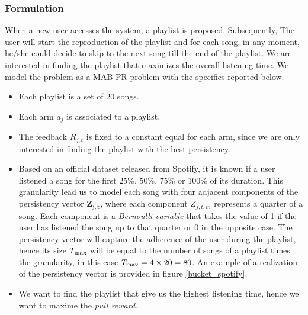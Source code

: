 \subsubsection*{Formulation}
When a new user accesses the system, a playlist is proposed. Subsequently, The user will start the reproduction of the playlist and for each song, in any moment, he/she could decide to skip to the next song till the end of the playlist. We are interested in finding the playlist that maximizes the overall listening time. We model the problem as a MAB-PR problem with the specifics reported below.
\begin{itemize}
	\item Each playlist is a set of 20 songs.
	\item Each arm $a_j$ is associated to a playlist.
	\item The feedback $R_{j,t}$ is fixed to a constant equal for each arm, since we are only interested in finding the playlist with the best persistency.
	\item Based on an official dataset released from Spotify, it is known if a user listened a song for the first 25\%, 50\%, 75\% or 100\% of its duration. This granularity lead us to model each song with four adjacent components of the persistency vector $\boldsymbol{Z_{j,t}}$, where each component $Z_{j,t,m}$ represents a quarter of a song. Each component is a \emph{Bernoulli variable} that takes the value of 1 if the user has listened the song up to that quarter or 0 in the opposite case. The persistency vector will capture the adherence of the user during the playlist, hence its size $T_{\textnormal{max}}$ will be equal to  the number of songs of a playlist times the granularity, in this case $T_{\textnormal{max}} = 4 \times 20 = 80$. An example of a realization of the persistency vector is provided in figure \ref{bucket_spotify}.
	\item We want to find the playlist that give us the highest listening time, hence we want to maxime the \emph{pull reward}.
	
\end{itemize}

